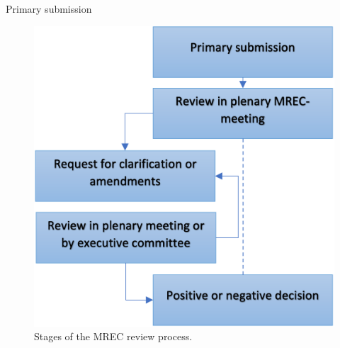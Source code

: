 \documentclass[authordate, empirical]{jote-new-article}
\begin{document}
	Primary submission





































	













	\begin{figure}
		\includegraphics[width=\linewidth]{media/Picture1.png}

		\caption{Stages of the MREC review process.}

	\end{figure}
	
\end{document}
